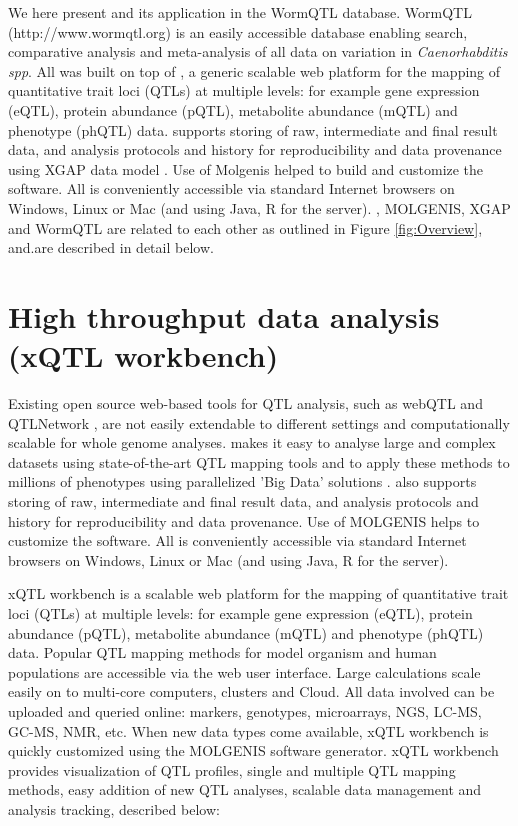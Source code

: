 We here present \xqtlwb and its application in the WormQTL database. WormQTL (http://www.wormqtl.org) is an 
easily accessible database enabling search, comparative analysis and meta-analysis of all data on variation in \emph{Caenorhabditis spp}.
All was built on top of \xqtlwb, a generic scalable web platform for the mapping of quantitative trait loci (QTLs)
 at multiple levels: for example gene expression (eQTL), protein abundance (pQTL), metabolite abundance (mQTL) and phenotype 
(phQTL) data. \xqtlwb supports storing of raw, intermediate and final result data, and analysis protocols and history 
for reproducibility and data provenance using XGAP data model \cite{Swertz:2010a}. Use of Molgenis \cite{Swertz:2010b} helped 
to build and customize the software. All is conveniently accessible via standard Internet browsers on Windows, Linux or Mac 
(and using Java, R for the server). \xqtlwb, MOLGENIS, XGAP and WormQTL are related to each other as outlined in 
Figure \ref{fig:Overview}, and.are described in detail below.

\section{High throughput data analysis (xQTL workbench)}
Existing open source web-based tools for QTL analysis, such as webQTL \cite{Wang:2003, Chesler:2004} and 
QTLNetwork \cite{Yang:2008}, are not easily extendable to different settings and computationally 
scalable for whole genome analyses. \xqtlwb makes it easy to analyse large and complex 
datasets using state-of-the-art QTL mapping tools and to apply these methods to millions of 
phenotypes using parallelized 'Big Data' solutions \cite{Trelles:2011}.
\xqtlwb also supports storing of raw, intermediate and final result data, and analysis protocols 
and history for reproducibility and data provenance. Use of MOLGENIS\cite{Swertz:2010b} 
helps to customize the software. All is conveniently accessible via standard Internet browsers on 
Windows, Linux or Mac (and using Java, R for the server).

xQTL workbench is a scalable web platform for the mapping of quantitative trait loci (QTLs) 
at multiple levels: for example gene expression (eQTL), protein abundance (pQTL), metabolite 
abundance (mQTL) and phenotype (phQTL) data. Popular QTL mapping methods for model organism 
and human populations are accessible via the web user interface. Large calculations scale 
easily on to multi-core computers, clusters and Cloud. All data involved can be uploaded 
and queried online: markers, genotypes, microarrays, NGS, LC-MS, GC-MS, NMR, etc. When new 
data types come available, xQTL workbench is quickly customized using the MOLGENIS software 
generator. xQTL workbench provides visualization of QTL profiles, single and multiple QTL 
mapping methods, easy addition of new QTL analyses, scalable data management and analysis 
tracking, described below:

